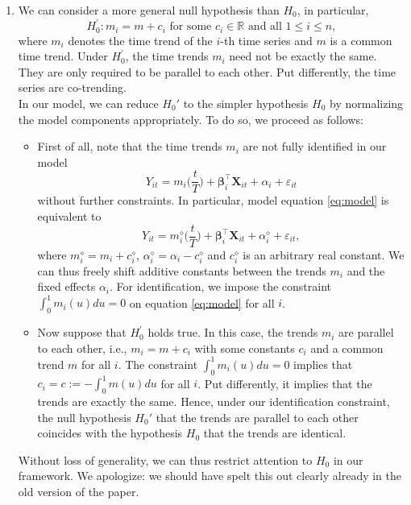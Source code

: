 \documentclass[a4paper,12pt]{article}
\begin{document}
\begin{enumerate}[label=\arabic*.,leftmargin=0.6cm]
\begin{enumerate}[leftmargin=0.7cm]
\item We can consider a more general null hypothesis than $H_0$, in particular, 
\[ H_0^\prime: m_i = m + c_i \text{ for some } c_i \in \mathbb{R} \text{ and all } 1 \le i \le n, \]
where $m_i$ denotes the time trend of the $i$-th time series and $m$ is a common time trend. Under $H_0^\prime$, the time trends $m_i$ need not be exactly the same. They are only required to be parallel to each other. Put differently, the time series are co-trending. \\
In our model, we can reduce $H_0'$ to the simpler hypothesis $H_0$ by normalizing the model components appropriately. To do so, we proceed as follows:
\pagebreak
\begin{itemize}
\item First of all, note that the time trends $m_i$ are not fully identified in our model
\begin{equation}\label{eq:model}
Y_{it} = m_i\Big(\frac{t}{T}\Big) + \boldsymbol{\beta}_i^\top \boldsymbol{X}_{it} + \alpha_i + \varepsilon_{it} 
\end{equation}
without further constraints. In particular, model equation \eqref{eq:model} is equivalent to 
\[ Y_{it} = m_i^\diamond\Big(\frac{t}{T}\Big) + \boldsymbol{\beta}_i^\top \boldsymbol{X}_{it} + \alpha_i^\diamond + \varepsilon_{it}, \]
where $m_i^\diamond = m_i + c_i^\diamond$, $\alpha_i^\diamond = \alpha_i - c_i^\diamond$ and $c_i^\diamond$ is an arbitrary real constant. We can thus freely shift additive constants between the trends $m_i$ and the fixed effects $\alpha_i$. For identification, we impose the constraint $\int_0^1 m_i(u) du = 0$ on equation \eqref{eq:model} for all $i$.
\item Now suppose that $H_0^\prime$ holds true. In this case, the trends $m_i$ are parallel to each other, i.e., $m_i = m + c_i$ with some constants $c_i$ and a common trend $m$ for all $i$. The constraint $\int_0^1 m_i(u) du = 0$ implies that $c_i = c := -\int_0^1 m(u) du$ for all $i$. Put differently, it implies that the trends are exactly the same. Hence, under our identification constraint, the null hypothesis $H_0'$ that the trends are parallel to each other coincides with the hypothesis $H_0$ that the trends are identical. 
\end{itemize}
Without loss of generality, we can thus restrict attention to $H_0$ in our framework. We apologize: we should have spelt this out clearly already in the old version of the paper. 


\end{enumerate}
\end{enumerate}
\end{document}
